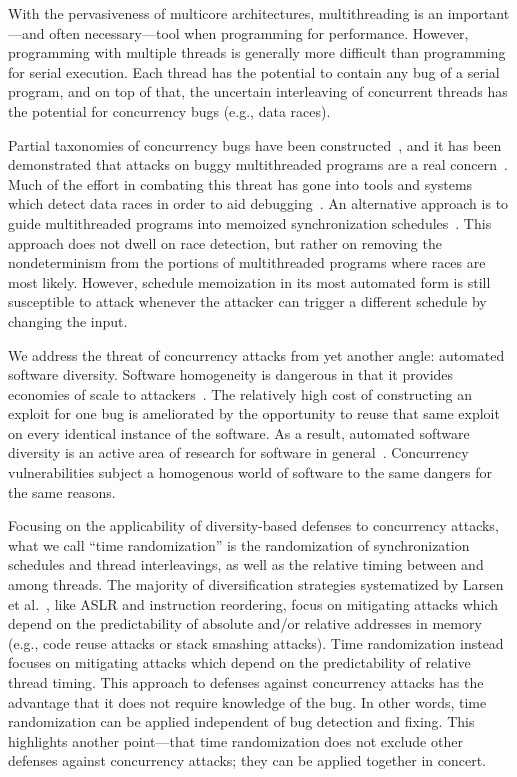 With the pervasiveness of multicore architectures, multithreading is an
important---and often necessary---tool when programming for performance.
However, programming with multiple threads is generally more difficult than programming for serial execution.
Each thread has the potential to contain any bug of a serial program, and on
top of that, the uncertain interleaving of concurrent threads has the
potential for concurrency bugs (e.g., data races).

Partial taxonomies of concurrency bugs have been constructed~\cite{Farchi2003, Lu2008}, and it has been demonstrated that attacks on buggy multithreaded programs are a real concern~\cite{Yang2012}.
Much of the effort in combating this threat has gone into tools and systems which detect data races in order to aid debugging~\cite{Savage1997, Flanagan2004, Laadan2011, Pratikakis2011, Kasikci2013}.
An alternative approach is to guide multithreaded programs into memoized synchronization schedules~\cite{Cui2010}.
This approach does not dwell on race detection, but rather on removing the nondeterminism from the portions of multithreaded programs where races are most likely.
However, schedule memoization in its most automated form is still susceptible to attack whenever the attacker can trigger a different schedule by changing the input.

We address the threat of concurrency attacks from yet another angle: automated software diversity.
Software homogeneity is dangerous in that it provides economies of scale to attackers~\cite{Geer2003b}.
The relatively high cost of constructing an exploit for one bug is ameliorated by the opportunity to reuse that same exploit on every identical instance of the software.
As a result, automated software diversity is an active area of research for software in general~\cite{Larsen2014}.
Concurrency vulnerabilities subject a homogenous world of software to the same dangers for the same reasons.

Focusing on the applicability of diversity-based defenses to concurrency attacks, what we call ``time randomization'' is the randomization of synchronization schedules and thread interleavings, as well as the relative timing between and among threads.
The majority of diversification strategies systematized by Larsen et al.~\cite{Larsen2014}, like ASLR and instruction reordering, focus on mitigating attacks which depend on the predictability of absolute and/or relative addresses in memory (e.g., code reuse attacks or stack smashing attacks).
Time randomization instead focuses on mitigating attacks which depend on the predictability of relative thread timing.
This approach to defenses against concurrency attacks has the advantage that it does not require knowledge of the bug.
In other words, time randomization can be applied independent of bug detection and fixing.
This highlights another point---that time randomization does not exclude other defenses against concurrency attacks; they can be applied together in concert.

